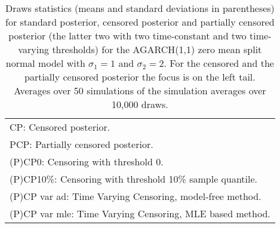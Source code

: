 {\begin{sidewaystable}
\begin{tabular}{cc cc| cccc| cccc}
\hline 
\multicolumn{12}{l}{\footnotesize{CP: Censored posterior.}}  \\ 
\multicolumn{12}{l}{\footnotesize{PCP: Partially censored posterior.}} \\ 
\multicolumn{12}{l}{\footnotesize{(P)CP0: Censoring with threshold 0.}} \\ 
\multicolumn{12}{l}{\footnotesize{(P)CP10\%: Censoring with threshold 10\% sample quantile.}}  \\ 
\multicolumn{12}{l}{\footnotesize{(P)CP var ad: Time Varying Censoring, model-free method.}} \\ 
\multicolumn{12}{l}{\footnotesize{(P)CP var mle: Time Varying Censoring, MLE based method.}}  \\ 
\end{tabular}
\caption{Draws statistics (means
and standard deviations in parentheses) for standard posterior, censored posterior and partially censored posterior (the latter two with two time-constant and two time-varying thresholds) for the AGARCH(1,1) zero mean split normal model with $\sigma_{1} = 1$ and $\sigma_{2} = 2$. For the censored and the partially censored posterior the focus is on the left tail. Averages over 50 simulations of the simulation averages over 10,000 draws.} 
\label{tab:agarch11_pcp_draws}  
\end{sidewaystable}
}